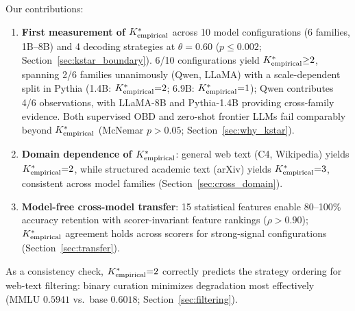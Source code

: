 Our contributions:
\begin{enumerate}[label=(\alph*),nosep]
  \item \textbf{First measurement of ${K^*_{\text{empirical}}}$} across 10 model configurations (6 families, 1B--8B) and 4 decoding strategies at $\theta{=}0.60$ ($p \leq 0.002$; Section~\ref{sec:kstar_boundary}).
  6/10 configurations yield ${K^*_{\text{empirical}}}{\geq}2$, spanning 2/6 families unanimously (Qwen, LLaMA) with a scale-dependent split in Pythia (1.4B: ${K^*_{\text{empirical}}}{=}2$; 6.9B: ${K^*_{\text{empirical}}}{=}1$); Qwen contributes 4/6 observations, with LLaMA-8B and Pythia-1.4B providing cross-family evidence.
  Both supervised OBD and zero-shot frontier LLMs fail comparably beyond ${K^*_{\text{empirical}}}$ (McNemar $p > 0.05$; Section~\ref{sec:why_kstar}).
  \item \textbf{Domain dependence of ${K^*_{\text{empirical}}}$}: general web text (C4, Wikipedia) yields ${K^*_{\text{empirical}}}{=}2$, while structured academic text (arXiv) yields ${K^*_{\text{empirical}}}{=}3$, consistent across model families (Section~\ref{sec:cross_domain}).
  \item \textbf{Model-free cross-model transfer}: 15 statistical features enable 80--100\% accuracy retention with scorer-invariant feature rankings ($\rho > 0.90$); ${K^*_{\text{empirical}}}$ agreement holds across scorers for strong-signal configurations (Section~\ref{sec:transfer}).
\end{enumerate}

\noindent As a consistency check, ${K^*_{\text{empirical}}}{=}2$ correctly predicts the strategy ordering for web-text filtering: binary curation minimizes degradation most effectively (MMLU $0.5941$ vs.\ base $0.6018$; Section~\ref{sec:filtering}).
